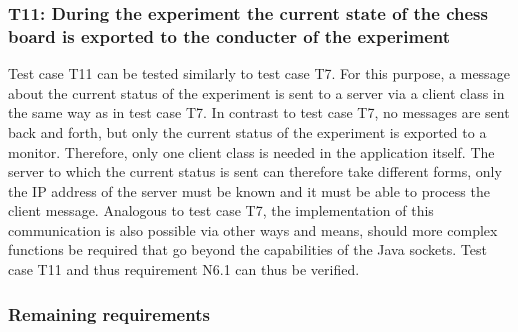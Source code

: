 \newpage\subsubsection*{T11: During the experiment the current state of the chess board is exported to the conducter of the experiment}

Test case T11 can be tested similarly to test case T7. For this purpose, a message about the current status of the experiment is sent to a server via a client class in the same way as in test case T7. In contrast to test case T7, no messages are sent back and forth, but only the current status of the experiment is exported to a monitor. Therefore, only one client class is needed in the application itself. The server to which the current status is sent can therefore take different forms, only the IP address of the server must be known and it must be able to process the client message. Analogous to test case T7, the implementation of this communication is also possible via other ways and means, should more complex functions be required that go beyond the capabilities of the Java sockets. Test case T11 and thus requirement N6.1 can thus be verified.


\subsubsection*{Remaining requirements}

